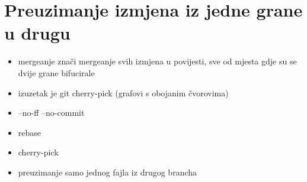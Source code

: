 \chapter*{Preuzimanje izmjena iz jedne grane u drugu}

\begin{itemize}
   \item mergeanje znači mergeanje svih izmjena u povijesti, sve od mjesta gdje su se dvije grane bifucirale
   \item izuzetak je git cherry-pick (grafovi s obojanim čvorovima)
   \item --no-ff --no-commit
   \item rebase
   \item cherry-pick
   \item preuzimanje samo jednog fajla iz drugog brancha
\end{itemize}


